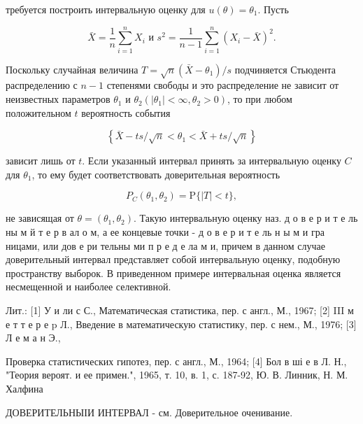 \documentclass[10pt]{article}
\begin{document}
требуется построить интервальную оценку для $u(\theta)=\theta_{1}$. Пусть



\[

\bar{X}=\frac{1}{n} \sum_{i=1}^{n} X_{i} \text { и } s^{2}=\frac{1}{n-1} \sum_{i=1}^{n}\left(X_{i}-\bar{X}\right)^{2} .

\]



Поскольку случайная величина $T=\sqrt{n}\left(\bar{X}-\theta_{1}\right) / s$ подчиняется Стьюдента распределению с $n-1$ степенями свободы и это распределение не зависит от неизвестных параметров $\theta_{1}$ и $\theta_{2}\left(\left|\theta_{1}\right|<\infty, \theta_{2}>0\right)$, то при любом положительном $t$ вероятность события



\[

\left\{\bar{X}-t s / \sqrt{n}<\theta_{1}<\bar{X}+t s / \sqrt{n}\right\}

\]



зависит лишь от $t$. Если указанный интервал принять за интервальную оценку $C$ для $\theta_{1}$, то ему будет соответствовать доверительная вероятность



\[

P_{C}\left(\theta_{1}, \theta_{2}\right)=\mathrm{P}\{|T|<t\},

\]



не зависящая от $\theta=\left(\theta_{1}, \theta_{2}\right)$. Такую интервальную оценку наз. д о в е р и т е ль ны м й т е р в ал о м, а ее концевые точки - д о в е р и т е ль н ы м и гра ницами, или дов е ри тельны ми п р е д е ла м и, причем в данном случае доверительный интервал представляет собой интервальную оценку, подобную пространству выборок. В приведенном примере интервальная оценка является несмещенной и наиболее селективной.



Лит.: [1] У и ли с С., Математическая статистика, пер. с англ., М., 1967; [2] III м е т т е р е p Л., Введение в математическую статистику, пер. с нем., М., 1976; [3] Л е м а н Э.,

Проверка статистических гипотез, пер. с англ., М., 1964; [4] Бол в ші е в Л. Н., "Теория вероят. и ее примен.", 1965, т. 10, в. 1, с. 187-92, Ю. В. Линник, Н. М. Халфина



ДОВЕРИТЕЛЬНЫІИ ИНТЕРВАЛ - см. Доверительное оченивание.
\end{document}
